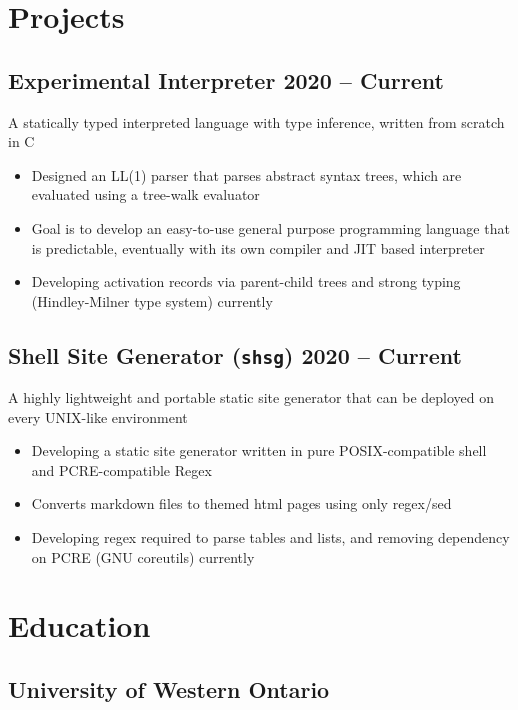 \documentclass{article}
\begin{document}
\section*{Projects}

\subsection{Experimental Interpreter \hfill \normalsize\textnormal{2020 -- Current}}
A statically typed interpreted language with type inference, written from scratch in C
\vspace{-0.5em}
\begin{itemize}
    \item Designed an LL(1) parser that parses abstract syntax trees, which are evaluated using a tree-walk evaluator 
    \item Goal is to develop an easy-to-use general purpose programming language that is predictable, eventually with its own compiler and JIT based interpreter 
    \item Developing activation records via parent-child trees and strong typing (Hindley-Milner type system) currently
\end{itemize}

\subsection{Shell Site Generator (\texttt{shsg}) \hfill \normalsize\textnormal{2020 -- Current}}
    A highly lightweight and portable static site generator that can be deployed on every UNIX-like environment
\vspace{-0.5em}
\begin{itemize}
    \item Developing a static site generator written in pure POSIX-compatible shell and PCRE-compatible Regex
    \item Converts markdown files to themed html pages using only regex/sed 
    \item Developing regex required to parse tables and lists, and removing dependency on PCRE (GNU coreutils) currently
\end{itemize}

\section{Education}
\subsection{University of Western Ontario}
\end{document}
